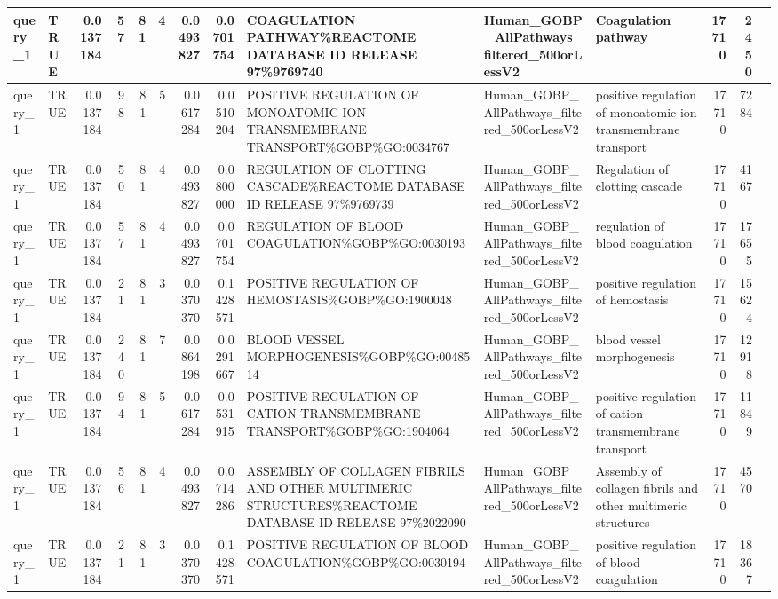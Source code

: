 \documentclass[
]{book}
\begin{document}
\begin{table}
\begin{tabular}[t]{l|l|r|r|r|r|r|r|l|l|l|r|r|l}
\hline
query\_1 & TRUE & 0.0137184 & 57 & 81 & 4 & 0.0493827 & 0.0701754 & COAGULATION PATHWAY\%REACTOME DATABASE ID RELEASE 97\%9769740 & Human\_GOBP\_AllPathways\_filtered\_500orLessV2 & Coagulation pathway & 17710 & 2450 & \\
\hline
query\_1 & TRUE & 0.0137184 & 98 & 81 & 5 & 0.0617284 & 0.0510204 & POSITIVE REGULATION OF MONOATOMIC ION TRANSMEMBRANE TRANSPORT\%GOBP\%GO:0034767 & Human\_GOBP\_AllPathways\_filtered\_500orLessV2 & positive regulation of monoatomic ion transmembrane transport & 17710 & 7284 & \\
\hline
query\_1 & TRUE & 0.0137184 & 50 & 81 & 4 & 0.0493827 & 0.0800000 & REGULATION OF CLOTTING CASCADE\%REACTOME DATABASE ID RELEASE 97\%9769739 & Human\_GOBP\_AllPathways\_filtered\_500orLessV2 & Regulation of clotting cascade & 17710 & 4167 & \\
\hline
query\_1 & TRUE & 0.0137184 & 57 & 81 & 4 & 0.0493827 & 0.0701754 & REGULATION OF BLOOD COAGULATION\%GOBP\%GO:0030193 & Human\_GOBP\_AllPathways\_filtered\_500orLessV2 & regulation of blood coagulation & 17710 & 17655 & \\
\hline
query\_1 & TRUE & 0.0137184 & 21 & 81 & 3 & 0.0370370 & 0.1428571 & POSITIVE REGULATION OF HEMOSTASIS\%GOBP\%GO:1900048 & Human\_GOBP\_AllPathways\_filtered\_500orLessV2 & positive regulation of hemostasis & 17710 & 15624 & \\
\hline
query\_1 & TRUE & 0.0137184 & 240 & 81 & 7 & 0.0864198 & 0.0291667 & BLOOD VESSEL MORPHOGENESIS\%GOBP\%GO:0048514 & Human\_GOBP\_AllPathways\_filtered\_500orLessV2 & blood vessel morphogenesis & 17710 & 12918 & \\
\hline
query\_1 & TRUE & 0.0137184 & 94 & 81 & 5 & 0.0617284 & 0.0531915 & POSITIVE REGULATION OF CATION TRANSMEMBRANE TRANSPORT\%GOBP\%GO:1904064 & Human\_GOBP\_AllPathways\_filtered\_500orLessV2 & positive regulation of cation transmembrane transport & 17710 & 11849 & \\
\hline
query\_1 & TRUE & 0.0137184 & 56 & 81 & 4 & 0.0493827 & 0.0714286 & ASSEMBLY OF COLLAGEN FIBRILS AND OTHER MULTIMERIC STRUCTURES\%REACTOME DATABASE ID RELEASE 97\%2022090 & Human\_GOBP\_AllPathways\_filtered\_500orLessV2 & Assembly of collagen fibrils and other multimeric structures & 17710 & 4570 & \\
\hline
query\_1 & TRUE & 0.0137184 & 21 & 81 & 3 & 0.0370370 & 0.1428571 & POSITIVE REGULATION OF BLOOD COAGULATION\%GOBP\%GO:0030194 & Human\_GOBP\_AllPathways\_filtered\_500orLessV2 & positive regulation of blood coagulation & 17710 & 18367 & \\

\end{tabular}
\end{table}
\end{document}
